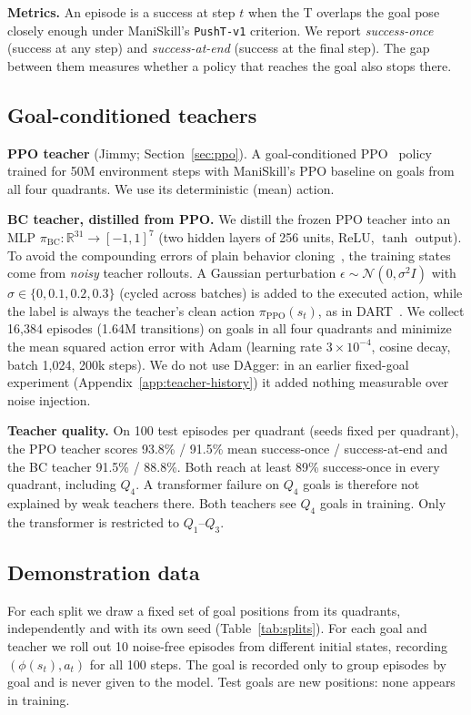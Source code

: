 \textbf{Metrics.} An episode is a success at step $t$ when the T overlaps the goal pose closely enough under ManiSkill's
\texttt{PushT-v1} criterion. %
We report \emph{success-once} (success at any step) and \emph{success-at-end} (success at the final step). The gap between them
measures whether a policy that reaches the goal also stops there.

\subsection{Goal-conditioned teachers}
\label{sec:teachers}

\textbf{PPO teacher} (Jimmy; Section~\ref{sec:ppo}). A goal-conditioned PPO~\cite{schulman2017ppo} policy trained for 50M
environment steps with ManiSkill's PPO baseline on goals from all four quadrants. We use its deterministic (mean) action.

\textbf{BC teacher, distilled from PPO.} We distill the frozen PPO teacher into an MLP
$\pi_{\mathrm{BC}}: \mathbb{R}^{31} \to [-1,1]^7$ (two hidden layers of 256 units, ReLU, $\tanh$ output). To avoid the compounding
errors of plain behavior cloning~\cite{ross2011dagger}, the training states come from \emph{noisy} teacher rollouts. A Gaussian
perturbation $\epsilon \sim \mathcal{N}(0,\sigma^2 I)$ with $\sigma \in \{0, 0.1, 0.2, 0.3\}$ (cycled across batches) is added to
the executed action, while the label is always the teacher's clean action $\pi_{\mathrm{PPO}}(s_t)$, as in DART~\cite{laskey2017dart}.
We collect 16{,}384 episodes (1.64M transitions) on goals in all four quadrants and minimize the mean squared action error with Adam
(learning rate $3\times10^{-4}$, cosine decay, batch 1{,}024, 200k steps). We do not use DAgger: in an earlier fixed-goal experiment
(Appendix~\ref{app:teacher-history}) it added nothing measurable over noise injection.

\textbf{Teacher quality.} On 100 test episodes per quadrant (seeds fixed per quadrant), the PPO teacher scores 93.8\% / 91.5\% mean
success-once / success-at-end and the BC teacher 91.5\% / 88.8\%. Both reach at least 89\% success-once in every quadrant, including $Q_4$.
A transformer failure on $Q_4$ goals is therefore not explained by weak teachers there.
Both teachers see $Q_4$ goals in training. Only the transformer is restricted to $Q_1$--$Q_3$.

\subsection{Demonstration data}
\label{sec:data}
For each split we draw a fixed set of goal positions from its quadrants, independently and with its own seed
(Table~\ref{tab:splits}). For each goal and teacher we roll out 10 noise-free episodes from different initial states, recording
$(\phi(s_t), a_t)$ for all 100 steps. The goal is recorded only to group episodes by goal and is never given to the model.
Test goals are new positions: none appears in training.

